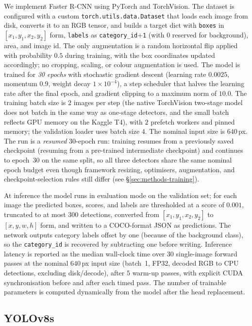 \documentclass[11pt,a4paper,twocolumn]{article}
\begin{document}
We implement Faster R-CNN using PyTorch and TorchVision. The dataset is configured with a
custom \texttt{torch.utils.data.Dataset} that loads each image from disk, converts it to an
RGB tensor, and builds a target dict with \texttt{boxes} in $[x_1,y_1,x_2,y_2]$ form,
\texttt{labels} as \texttt{category\_id$+$1} (with $0$ reserved for background), area, and
image id. The only augmentation is a random horizontal flip applied with probability $0.5$
during training, with the box coordinates updated accordingly; no cropping, scaling, or
colour augmentation is used. The model is trained for \emph{30 epochs} with stochastic gradient descent (learning rate $0.0025$, momentum $0.9$, weight decay $1\times 10^{-4}$), a step scheduler that halves the learning rate after the final epoch, and gradient clipping to a maximum norm of $10.0$. The training batch size is $2$ images per step (the native TorchVision two-stage model does not batch in the same way as one-stage detectors, and the small batch reflects GPU memory on the Kaggle T4), with $2$ prefetch workers and pinned memory; the validation loader uses batch size $4$. The nominal input size is $640$\,px. The run is a \emph{resumed} 30-epoch run: training resumes from a previously saved checkpoint (resuming from a pre-trained intermediate checkpoint) and continues to epoch~30 on the same split, so all three detectors share the same nominal epoch budget even though framework resizing, optimisers, augmentation, and checkpoint-selection rules still differ (see \S\ref{sec:methods-training}).

At inference the model runs in evaluation mode on the validation set; for each image the predicted boxes, scores, and labels are thresholded at a score of $0.001$, truncated to at most $300$ detections, converted from $[x_1,y_1,x_2,y_2]$ to $[x,y,w,h]$ form, and written to a COCO-format JSON as predictions. The network outputs category labels offset by one (because of the background class), so the \texttt{category\_id} is recovered by subtracting one before writing. Inference latency is reported as the median wall-clock time over $30$ single-image forward passes at the nominal $640$\,px input size (batch~1, FP32, decoded RGB to CPU detections, excluding disk/decode), after $5$ warm-up passes, with explicit CUDA synchronisation before and after each timed pass. The number of trainable parameters is computed dynamically from the model after the head replacement.

\subsection{YOLOv8s}
\label{sec:methods-yolov8s}
\end{document}
